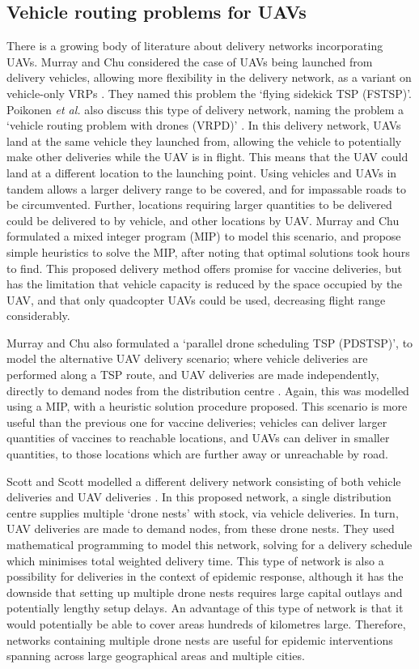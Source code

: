 \subsection{Vehicle routing problems for UAVs}
\label{sec:lit_vrpUAV}
There is a growing body of literature about delivery networks incorporating UAVs. 
Murray and Chu considered the case of UAVs being launched from delivery vehicles, allowing more flexibility in the delivery network, as a variant on vehicle-only VRPs \cite{murray2015flying}. They named this problem the `flying sidekick TSP (FSTSP)'. Poikonen \textit{et al.} also discuss this type of delivery network, naming the problem a `vehicle routing problem with drones (VRPD)' \cite{poikonen2017vehicle}. In this delivery network, UAVs land at the same vehicle they launched from, allowing the vehicle to potentially make other deliveries while the UAV is in flight. This means that the UAV could land at a different location to the launching point. Using vehicles and UAVs in tandem allows a larger delivery range to be covered, and for impassable roads to be circumvented. Further, locations requiring larger quantities to be delivered could be delivered to by vehicle, and other locations by UAV. Murray and Chu formulated a mixed integer program (MIP) to model this scenario, and propose simple heuristics to solve the MIP, after noting that optimal solutions took hours to find. This proposed delivery method offers promise for vaccine deliveries, but has the limitation that vehicle capacity is reduced by the space occupied by the UAV, and that only quadcopter UAVs could be used, decreasing flight range considerably.

Murray and Chu also formulated a `parallel drone scheduling TSP (PDSTSP)', to model the alternative UAV delivery scenario; where vehicle deliveries are performed along a TSP route, and UAV deliveries are made independently, directly to demand nodes from the distribution centre \cite{murray2015flying}. Again, this was modelled using a MIP, with a heuristic solution procedure proposed. This scenario is more useful than the previous one for vaccine deliveries; vehicles can deliver larger quantities of vaccines to reachable locations, and UAVs can deliver in smaller quantities, to those locations which are further away or unreachable by road.

Scott and Scott modelled a different delivery network consisting of both vehicle deliveries and UAV deliveries \cite{scott2017drone}. In this proposed network, a single distribution centre supplies multiple `drone nests' with stock, via vehicle deliveries. In turn, UAV deliveries are made to demand nodes, from these drone nests. They used mathematical programming to model this network, solving for a delivery schedule which minimises total weighted delivery time. This type of network is also a possibility for deliveries in the context of epidemic response, although it has the downside that setting up multiple drone nests requires large capital outlays and potentially lengthy setup delays. An advantage of this type of network is that it would potentially be able to cover areas hundreds of kilometres large. Therefore, networks containing multiple drone nests are useful for epidemic interventions spanning across large geographical areas and multiple cities.

